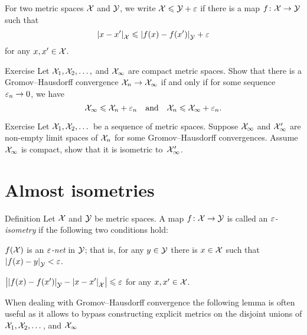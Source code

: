 For two metric spaces $\mathcal{X}$ and $\mathcal{Y}$,
we write $\mathcal{X}\leqslant \mathcal{Y}+\varepsilon$ if
there is a map $f\colon\mathcal{X}\to \mathcal{Y}$ such that 
\[|{x}-{x'}|_{\mathcal{X}}^{{}}\leqslant |{f(x)}-{f(x')}|_{\mathcal{Y}}^{{}}+\varepsilon\]
for any $x,x'\in \mathcal{X}$.

\begin{thm}{Exercise}\label{ex:GH-po}
Let $\mathcal{X}_1,\mathcal{X}_2,\dots,$ and $\mathcal{X}_\infty$ are compact metric spaces.
Show that there is a Gromov--Hausdorff convergence $\mathcal{X}_n\to\mathcal{X}_\infty$ if and only if for some sequence $\varepsilon_n\to 0$,
we have 
\[\mathcal{X}_\infty\leqslant \mathcal{X}_n+\varepsilon_n\quad\text{and}\quad \mathcal{X}_n\leqslant \mathcal{X}_\infty+\varepsilon_n.\]
\end{thm}

\begin{thm}{Exercise}\label{ex:compact-GH}
Let $\mathcal{X}_1,\mathcal{X}_2,\dots$ be a sequence of metric spaces.
Suppose $\mathcal{X}_\infty$ and $\mathcal{X}_\infty'$ are non-empty limit spaces of $\mathcal{X}_n$ for some Gromov--Hausdorff convergences.
Assume $\mathcal{X}_\infty$ is compact, show that it is isometric to~$\mathcal{X}_\infty'$.
\end{thm}

\section{Almost isometries}\label{sec:Almost isometries}

\begin{thm}{Definition}
Let $\mathcal{X}$ and $\mathcal{Y}$ be metric spaces.
A map $f\colon\mathcal{X}\to\mathcal{Y}$
is called an \emph{$\varepsilon$-isometry}
if the following two conditions hold:

\begin{subthm}{}
$f(\mathcal{X})$ is an \emph{$\varepsilon$-net} in $\mathcal{Y}$; that is, for any $y\in \mathcal{Y}$ there is $x\in \mathcal{X}$ such that $|{f(x)}-{y}|_{\mathcal{Y}}^{{}}<\varepsilon$.
\end{subthm}

\begin{subthm}{}
$\bigl||{f(x)}-{f(x')}|_{\mathcal{Y}}^{{}}-|{x}-{x'}|_{\mathcal{X}}^{{}}\bigr|\leqslant \varepsilon$ for any $x,x'\in\mathcal{X}$.
\end{subthm}

\end{thm}

When dealing with Gromov--Hausdorff convergence the following lemma is often useful as it allows to bypass constructing explicit metrics on the disjoint unions of $\mathcal{X}_1,\mathcal{X}_2,\dots$, and $\mathcal{X}_\infty$

